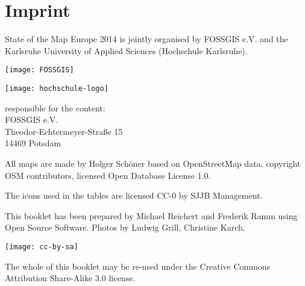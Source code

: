 \newpage
\section*{Imprint}
\label{imprint}

\begin{raggedright}
State of the Map Europe 2014 is jointly organised by FOSSGIS
e.V. and the Karlsruhe University of Applied Sciences
(Hochschule Karlsruhe).

\vspace{0.5em}
 \begin{minipage}[htbp]{0.47\textwidth}
	\texttt{[image: FOSSGIS]}
\end{minipage}
\hfill
\begin{minipage}[hbtp]{0.47\textwidth}
\texttt{[image: hochschule-logo]}
\end{minipage}

\vspace{1.6em}
\noindent responsible for the content:\\
FOSSGIS e.V.\\
Theodor-Echtermeyer-Straße 15\\
14469 Potsdam

\vspace{1em}
\noindent All maps are made by Holger Schöner based on Open\-Street\-Map
data, copyright OSM contributors, licensed Open Database License 1.0.

\vspace{0.5em}
\noindent The icons used in the tables are licensed CC-0 by SJJB Management.

\vspace{0.5em}
\noindent This booklet has been prepared by Michael Reichert and Frederik
Ramm using Open Source Software. Photos by Ludwig Grill,
Christine Karch.

\vspace{1em}
\noindent \begin{minipage}[htbp]{0.2\textwidth}
\noindent\texttt{[image: cc-by-sa]}
\end{minipage}
\hfill
\begin{minipage}[hbtp]{0.74\textwidth}
The whole of this booklet may be re-used under the Creative
Commons Attribution Share-Alike 3.0 license.
\end{minipage}
\end{raggedright}

